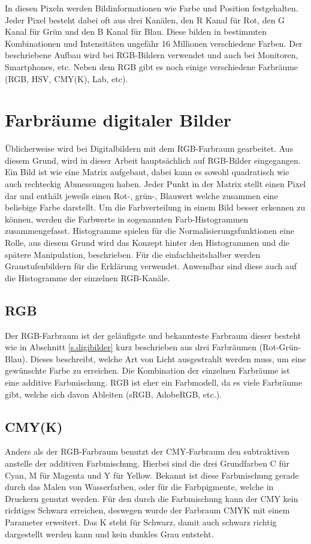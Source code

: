 In diesen Pixeln werden Bildinformationen wie Farbe und Position festgehalten. Jeder Pixel besteht dabei oft aus drei Kanälen, den R Kanal für Rot, den G Kanal für Grün und den B Kanal für Blau. Diese bilden in bestimmten Kombinationen und Intensitäten ungefähr 16 Millionen verschiedene Farben. Der beschriebene Aufbau wird bei RGB-Bildern verwendet und auch bei Monitoren, Smartphones, etc. Neben dem RGB gibt es noch einige verschiedene Farbräume (RGB, HSV, CMY(K), Lab, etc).
\section{Farbräume digitaler Bilder}\label{s.aufbdigibilder}
Üblicherweise wird bei Digitalbildern mit dem RGB-Farbraum gearbeitet. Aus diesem Grund, wird in dieser Arbeit hauptsächlich auf RGB-Bilder eingegangen. Ein Bild ist wie eine Matrix aufgebaut, dabei kann es sowohl quadratisch wie auch rechteckig Abmessungen haben. Jeder Punkt in der Matrix stellt einen Pixel dar und enthält jeweils einen Rot-, grün-, Blauwert welche zusammen eine beliebige Farbe darstellt. Um die Farbverteilung in einem Bild besser erkennen zu können, werden die Farbwerte in sogenannten Farb-Histogrammen zusammengefasst. Histogramme spielen für die Normalisierungsfunktionen eine Rolle, aus diesem Grund wird das Konzept hinter den Histogrammen und die spätere Manipulation, beschrieben. Für die einfachheitshalber werden Graustufenbildern für die Erklärung verwendet. Anwendbar sind diese auch auf die Histogramme der einzelnen RGB-Kanäle.
 \subsection{RGB}\label{s.rgb}
Der RGB-Farbraum ist der geläufigste und bekannteste Farbraum dieser besteht wie in Abschnitt \ref{s.digibilder} kurz beschrieben aus drei Farbräumen (Rot-Grün-Blau). Dieses beschreibt, welche Art von Licht ausgestrahlt werden muss, um eine gewünschte Farbe zu erreichen. Die Kombination der einzelnen Farbräume ist eine additive Farbmischung. RGB ist eher ein Farbmodell, da es viele Farbräume gibt, welche sich davon Ableiten (sRGB, AdobeRGB, etc.).
\subsection{CMY(K)}\label{s.cmy}
Anders als der RGB-Farbraum benutzt der CMY-Farbraum den subtraktiven anstelle der additiven Farbmischung. Hierbei sind die drei Grundfarben C für Cyan, M für Magenta und Y für Yellow. Bekannt ist diese Farbmischung gerade durch das Malen von Wasserfarben, oder für die Farbpigmente, welche in Druckern genutzt werden. Für den durch die Farbmischung kann der CMY kein richtiges Schwarz erreichen, deswegen wurde der Farbraum CMYK mit einem Parameter erweitert. Das K steht für Schwarz, damit auch schwarz richtig dargestellt werden kann und kein dunkles Grau entsteht.

